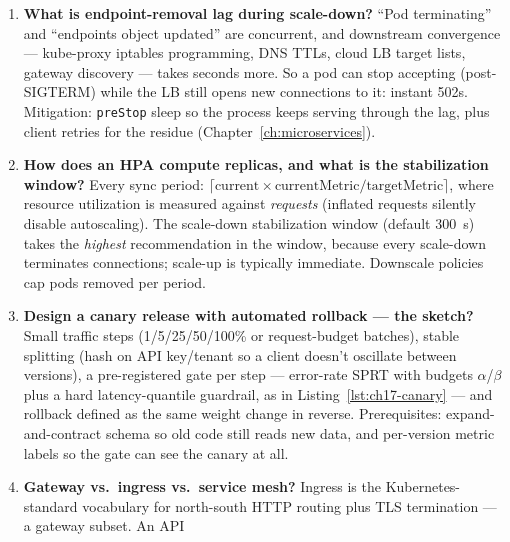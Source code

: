 \begin{enumerate}[label=\textbf{Q\arabic*.}, leftmargin=1.6cm, start=11]
        above the replica count allowed during rollout (needs quota).
        \texttt{maxUnavailable}: replicas allowed to be down. With
        $R{=}4$: \texttt{surge 1 / unavailable 0} never serves below 4
        and costs one extra pod; \texttt{surge 0 / unavailable 1} costs
        nothing but serves a window at 3. \texttt{0/0} cannot roll at
        all --- a common copy-paste wedge.
  \item \textbf{What is endpoint-removal lag during scale-down?}
        ``Pod terminating'' and ``endpoints object updated'' are
        concurrent, and downstream convergence --- kube-proxy iptables
        programming, DNS TTLs, cloud LB target lists, gateway discovery
        --- takes seconds more. So a pod can stop accepting (post-SIGTERM)
        while the LB still opens new connections to it: instant 502s.
        Mitigation: \texttt{preStop} sleep so the process keeps serving
        through the lag, plus client retries for the residue
        (Chapter~\ref{ch:microservices}).
  \item \textbf{How does an HPA compute replicas, and what is the
        stabilization window?}
        Every sync period:
        $\lceil \text{current} \times \text{currentMetric} /
        \text{targetMetric} \rceil$, where resource utilization is
        measured against \emph{requests} (inflated requests silently
        disable autoscaling). The scale-down stabilization window
        (default 300~s) takes the \emph{highest} recommendation in the
        window, because every scale-down terminates connections; scale-up
        is typically immediate. Downscale policies cap pods removed per
        period.
  \item \textbf{Design a canary release with automated rollback --- the
        sketch?}
        Small traffic steps (1/5/25/50/100\% or request-budget batches),
        stable splitting (hash on API key/tenant so a client doesn't
        oscillate between versions), a pre-registered gate per step ---
        error-rate SPRT with budgets $\alpha$/$\beta$ plus a hard
        latency-quantile guardrail, as in
        Listing~\ref{lst:ch17-canary} --- and rollback defined as the
        same weight change in reverse. Prerequisites: expand-and-contract
        schema so old code still reads new data, and per-version metric
        labels so the gate can see the canary at all.
  \item \textbf{Gateway vs.\ ingress vs.\ service mesh?}
        Ingress is the Kubernetes-standard vocabulary for north-south
        HTTP routing plus TLS termination --- a gateway subset. An API

\end{enumerate}
